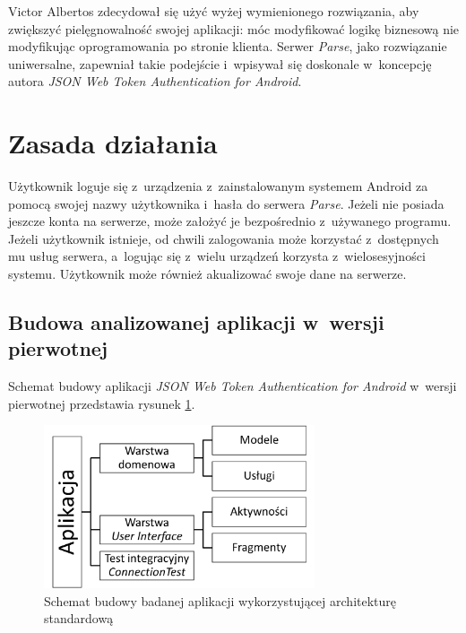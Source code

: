 Victor Albertos zdecydował się użyć wyżej wymienionego rozwiązania, aby zwiększyć pielęgnowalność swojej aplikacji: móc modyfikować logikę biznesową nie modyfikując oprogramowania po stronie klienta. Serwer \textit{Parse}, jako rozwiązanie uniwersalne, zapewniał takie podejście i~wpisywał się doskonale w~koncepcję autora \textit{JSON Web Token Authentication for Android}.

\section{Zasada działania}
Użytkownik loguje się z~urządzenia z~zainstalowanym systemem Android za pomocą swojej nazwy użytkownika i~hasła do serwera \textit{Parse}. Jeżeli nie posiada jeszcze konta na serwerze, może założyć je bezpośrednio z~używanego programu. Jeżeli użytkownik istnieje, od chwili zalogowania może korzystać z~dostępnych mu usług serwera, a~logując się z~wielu urządzeń korzysta z~wielosesyjności systemu.  Użytkownik może również akualizować swoje dane na serwerze.


\subsection{Budowa analizowanej aplikacji w~wersji pierwotnej}
Schemat budowy aplikacji \textit{JSON Web Token Authentication for Android} w~wersji pierwotnej przedstawia rysunek \ref{fig:app_std}.

\begin{figure}[!htb]
    \centering
    \includegraphics[width=8cm]{imgs/ch6_app_st_diagram.png}
    \caption
{Schemat budowy badanej aplikacji wykorzystującej architekturę standardową}
    \label{fig:app_std}
\end{figure} 

